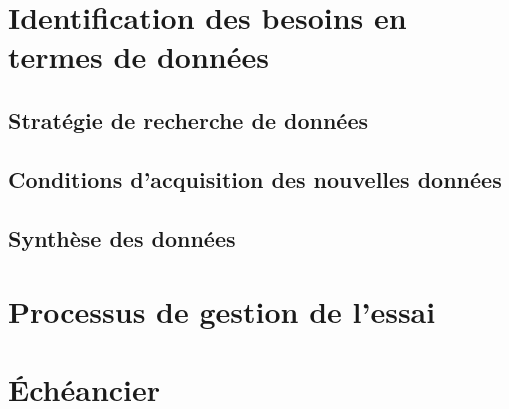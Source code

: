 \documentclass[12pt, letterpaper]{article}
\begin{document}
\section{Identification des besoins en termes de données}

\subsection{Stratégie de recherche de données}

\subsection{Conditions d'acquisition des nouvelles données} \label{sect:conditions}

\subsection{Synthèse des données}

\section{Processus de gestion de l'essai}

\section{Échéancier}

\clearpage 
\newpage
\printbibliography[title={\bibname\label{bib:references}}] 
\end{document}
